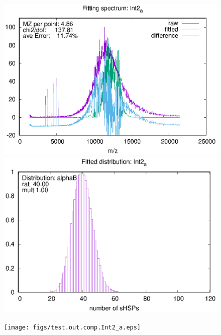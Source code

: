 \documentclass[a4paper,12pt]{report}
\begin{document}
\begin{figure}
\begin{minipage}[l]{0.323333\linewidth}
\centering
\includegraphics[trim=0mm 0mm 0mm 0mm, clip=true,width=1\textwidth]{figs/test.outInt2_a.eps}
\end{minipage}
\begin{minipage}[l]{0.323333\linewidth}
\centering
\includegraphics[trim=0mm 0mm 0mm 0mm, clip=true,width=1\textwidth]{figs/test.inpInt2_a.eps}
\end{minipage}
\begin{minipage}[l]{0.323333\linewidth}
\centering
\texttt{[image: figs/test.out.comp.Int2\_a.eps]}
\end{minipage}


\end{figure}
\end{document}
